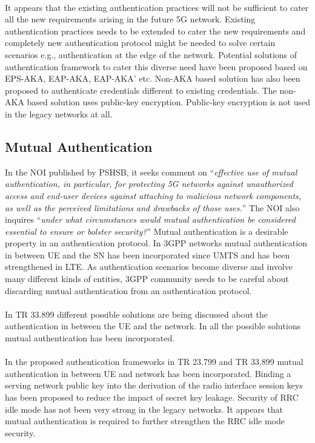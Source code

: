\documentclass[12pt]{llncs}
\newcommand\ques[1]{``\emph{#1}''}
\begin{document}
\paragraph{}
It appears that the existing authentication practices will not be sufficient to cater all the new requirements arising in the future 5G network. Existing authentication practices needs to be extended to cater the new requirements and completely new authentication protocol might be needed to solve certain scenarios e.g., authentication at the edge of the network. Potential solutions of authentication framework to cater this diverse need have been proposed based on EPS-AKA, EAP-AKA, EAP-AKA' etc. Non-AKA based solution has also been proposed to authenticate credentials different to existing credentials. The non-AKA based solution uses public-key encryption. Public-key encryption is not used in the legacy networks at all.  

\subsection{Mutual Authentication}
In the NOI published by PSHSB, it seeks comment on \ques{effective use of mutual authentication, in particular, for protecting 5G networks against unauthorized access and end-user devices against attaching to malicious network components, as well as the perceived limitations and drawbacks of those uses.} The NOI also inquires \ques{under what circumstances would mutual authentication be considered essential to ensure or
bolster security?} Mutual authentication is a desirable property in an authentication protocol. In 3GPP networks mutual authentication in between UE and the SN has been incorporated since UMTS and has been strengthened in LTE. As authentication scenarios become diverse and involve many different kinds of entities, 3GPP community needs to be careful about discarding mutual authentication from an authentication protocol. 
\paragraph{}
In TR 33.899 different possible solutions are being discussed about the authentication in between the UE and the network. In all the possible solutions mutual authentication has been incorporated. 
\paragraph{}
In the proposed authentication frameworks in TR 23.799 and TR 33.899 mutual authentication in between UE and network has been incorporated. Binding a serving network public key into the derivation of the radio interface session keys has been proposed to reduce the impact of secret key leakage. Security of RRC idle mode has not been very strong in the legacy networks. It appears that mutual authentication is required to further strengthen the RRC idle mode security.
\end{document}
